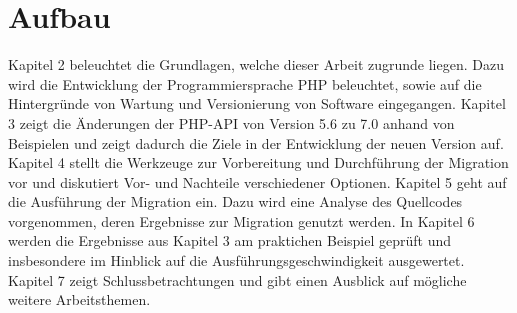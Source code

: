 \section{Aufbau}
Kapitel 2 beleuchtet die Grundlagen, welche dieser Arbeit zugrunde liegen. Dazu wird die Entwicklung der Programmiersprache PHP 
beleuchtet, sowie auf die Hintergründe von Wartung und Versionierung von Software eingegangen.
Kapitel 3 zeigt die Änderungen der PHP-API von Version 5.6 zu 7.0 anhand von Beispielen und zeigt dadurch die Ziele in der 
Entwicklung der neuen Version auf.
Kapitel 4 stellt die Werkzeuge zur Vorbereitung und Durchführung der Migration vor und diskutiert Vor- und Nachteile verschiedener 
Optionen.
Kapitel 5 geht auf die Ausführung der Migration ein. Dazu wird eine Analyse des Quellcodes vorgenommen, deren Ergebnisse 
zur Migration genutzt werden. 
In Kapitel 6 werden die Ergebnisse aus Kapitel 3 am praktichen Beispiel geprüft und insbesondere im Hinblick auf die 
Ausführungsgeschwindigkeit ausgewertet.
Kapitel 7 zeigt Schlussbetrachtungen und gibt einen Ausblick auf mögliche weitere Arbeitsthemen.
